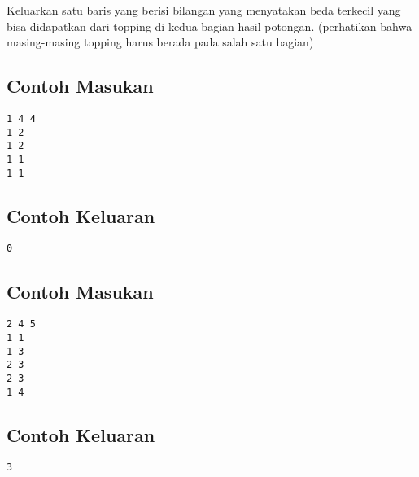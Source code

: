 \documentclass{article}
\begin{document}
Keluarkan satu baris yang berisi bilangan yang menyatakan beda terkecil yang bisa didapatkan dari topping di kedua bagian hasil potongan. (perhatikan bahwa masing-masing topping harus berada pada salah satu bagian)

\newline
\begin{multicols}{2}
\subsection*{Contoh Masukan}
\begin{lstlisting}
1 4 4
1 2
1 2
1 1
1 1
\end{lstlisting}
\columnbreak
\subsection*{Contoh Keluaran}
\begin{lstlisting}
0
\end{lstlisting}
\vfill
\null
\end{multicols}

\begin{multicols}{2}
\subsection*{Contoh Masukan}
\begin{lstlisting}
2 4 5
1 1
1 3
2 3
2 3
1 4
\end{lstlisting}
\columnbreak
\subsection*{Contoh Keluaran}
\begin{lstlisting}
3
\end{lstlisting}
\vfill
\null
\end{multicols}


\pagebreak
\end{document}
